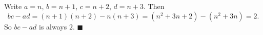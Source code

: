 Write $a=n$, $b=n+1$, $c=n+2$, $d=n+3$. Then
\[
bc-ad=(n+1)(n+2)-n(n+3)=(n^2+3n+2)-(n^2+3n)=2 .
\]
So $bc-ad$ is always $\boxed{2}$. $\blacksquare$
